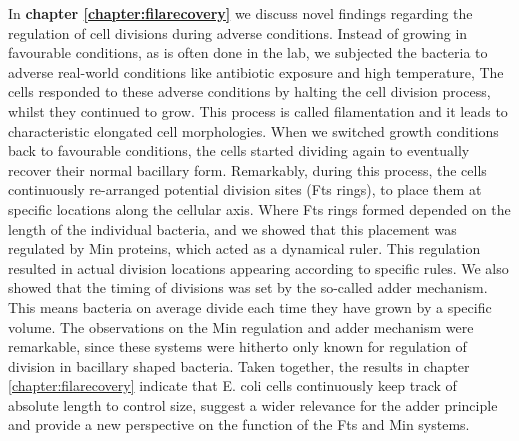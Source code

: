 In \textbf{chapter \ref{chapter:filarecovery}} we discuss 
novel findings regarding 
the regulation of cell divisions during adverse conditions.
%
Instead of growing \ecoli in favourable conditions, as is often done in the lab, we subjected the bacteria to 
adverse real-world conditions like antibiotic exposure and high temperature, 
%
The cells responded to these adverse conditions by halting the cell division process, whilst they continued to grow.
This process is called filamentation and it leads to characteristic elongated cell morphologies.
%
%
When we switched growth conditions back to favourable conditions,
the cells started dividing again to eventually recover their normal bacillary form. %
%
Remarkably, during this process,
the cells continuously re-arranged potential division sites (Fts rings), 
to place them at specific locations along the cellular axis. %
%
Where Fts rings formed depended on the length of the individual bacteria,
and we showed that this placement was regulated by Min proteins, which acted as a dynamical ruler.
%
This regulation resulted in actual division locations appearing according to specific rules.
%
We also showed that the timing of divisions was set by the so-called adder mechanism.
This means bacteria on average divide each time they have grown by a specific volume.
%
The observations on the Min regulation and adder mechanism were remarkable,
since these systems were hitherto only known for regulation of division in bacillary shaped bacteria.
%
Taken together, the results in chapter \ref{chapter:filarecovery} indicate that E. coli cells continuously keep track of absolute length to control size, 
suggest a wider relevance for the adder principle 
and provide a new perspective on the function of the Fts and Min systems.



